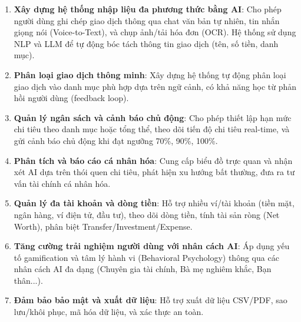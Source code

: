 \begin{enumerate}
    \item \textbf{Xây dựng hệ thống nhập liệu đa phương thức bằng AI}: Cho phép người dùng ghi chép giao dịch thông qua chat văn bản tự nhiên, tin nhắn giọng nói (Voice-to-Text), và chụp ảnh/tải hóa đơn (OCR). Hệ thống sử dụng NLP và LLM để tự động bóc tách thông tin giao dịch (tên, số tiền, danh mục).
    
    \item \textbf{Phân loại giao dịch thông minh}: Xây dựng hệ thống tự động phân loại giao dịch vào danh mục phù hợp dựa trên ngữ cảnh, có khả năng học từ phản hồi người dùng (feedback loop).
    
    \item \textbf{Quản lý ngân sách và cảnh báo chủ động}: Cho phép thiết lập hạn mức chi tiêu theo danh mục hoặc tổng thể, theo dõi tiến độ chi tiêu real-time, và gửi cảnh báo chủ động khi đạt ngưỡng 70\%, 90\%, 100\%.
    
    \item \textbf{Phân tích và báo cáo cá nhân hóa}: Cung cấp biểu đồ trực quan và nhận xét AI dựa trên thói quen chi tiêu, phát hiện xu hướng bất thường, đưa ra tư vấn tài chính cá nhân hóa.
    
    \item \textbf{Quản lý đa tài khoản và dòng tiền}: Hỗ trợ nhiều ví/tài khoản (tiền mặt, ngân hàng, ví điện tử, đầu tư), theo dõi dòng tiền, tính tài sản ròng (Net Worth), phân biệt Transfer/Investment/Expense.
    
    \item \textbf{Tăng cường trải nghiệm người dùng với nhân cách AI}: Áp dụng yếu tố gamification và tâm lý hành vi (Behavioral Psychology) thông qua các nhân cách AI đa dạng (Chuyên gia tài chính, Bà mẹ nghiêm khắc, Bạn thân...).
    
    \item \textbf{Đảm bảo bảo mật và xuất dữ liệu}: Hỗ trợ xuất dữ liệu CSV/PDF, sao lưu/khôi phục, mã hóa dữ liệu, và xác thực an toàn.
\end{enumerate}
